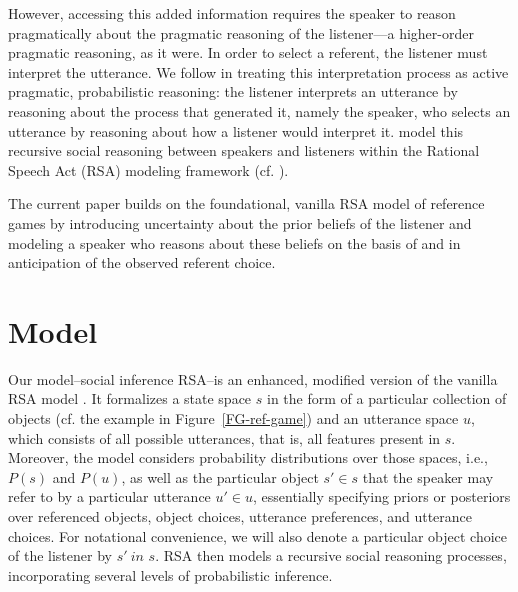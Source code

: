 \documentclass[10pt,a4paper]{article}
\begin{document}
However, accessing this added information requires the speaker to reason pragmatically about the pragmatic reasoning of the listener---a higher-order pragmatic reasoning, as it were.
In order to select a referent, the listener must interpret the utterance. We follow  in treating this interpretation process as active pragmatic, probabilistic reasoning: the listener interprets an utterance by reasoning about the process that generated it, namely the speaker, who selects an utterance by reasoning about how a listener would interpret it. \citeauthor{frankgoodman2012} model this recursive social reasoning between speakers and listeners within the Rational Speech Act (RSA) modeling framework (cf. ).

The current paper builds on the foundational, vanilla RSA model of reference games by introducing uncertainty about the prior beliefs of the listener and modeling a speaker who reasons about these beliefs on the basis of and in anticipation of the observed referent choice. 



\section{Model}
Our model--social inference RSA--is an enhanced, modified version of the vanilla RSA model \cite{frankgoodman2012}.
It formalizes a state space $s$ in the form of a particular collection of objects (cf. the example in Figure~\ref{FG-ref-game}) and an utterance space $u$,
which consists of all possible utterances, that is, all features present in $s$. 
Moreover, the model considers probability distributions over those spaces, i.e., $P(s)$ and $P(u)$, as well as the particular object $s'\in s$ that the speaker may refer to by a particular utterance $u' \in u$, essentially specifying priors or posteriors over referenced objects, object choices, utterance preferences, and utterance choices. 
For notational convenience, we will also denote a particular object choice of the listener by $s' \ in$ $s$.
RSA then models a recursive social reasoning processes, incorporating several levels of probabilistic inference. 
\end{document}
